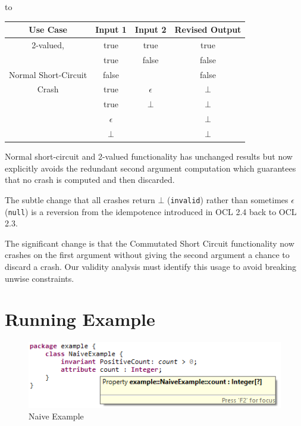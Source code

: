 \documentclass[
]{ceurart}
\begin{document}
to

\begin{center}
	\begin{tabular}{|c||c|c||c|}
		\hline
		Use Case & Input 1 & Input 2 & Revised Output \\
		\hline
		\hline
		2-valued, & true & true & true \\
		& true & false & false \\
		Normal Short-Circuit & false &  & false \\
		\hline
		Crash & true & $\epsilon$ & $\bot$ \\
		& true & $\bot$ & $\bot$ \\
		& $\epsilon$ & & $\bot$ \\
		& $\bot$ & & $\bot$ \\
		\hline
	\end{tabular}
\end{center}

Normal short-circuit and 2-valued functionality has unchanged results but now explicitly avoids the redundant second argument computation which guarantees that no crash is computed and then discarded.


The subtle change that all crashes return $\bot$ (\verb|invalid|) rather than sometimes $\epsilon$ (\verb|null|) is a reversion from the idempotence introduced in OCL 2.4 back to OCL 2.3.

The significant change is that the Commutated Short Circuit functionality now crashes on the first argument without giving the second argument a chance to discard a crash. Our validity analysis must identify this usage to avoid breaking unwise constraints.
 
\section{Running Example}\label{Running Example}

\begin{figure}
	\vspace{-10pt}
	\begin{center}
		\includegraphics[width=5.0in]{NaiveExample.png}
	\end{center}
	\vspace{-10pt}
	\caption{Naive Example}
	\label{fig:NaiveExample}
	\vspace{-10pt}
\end{figure}
\end{document}
